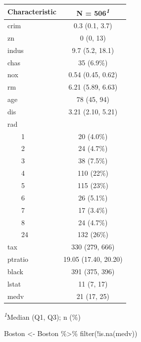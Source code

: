 \documentclass[
]{article}
\newenvironment{Shaded}{\begin{snugshade}}{\end{snugshade}}
\newcommand{\FunctionTok}[1]{\textcolor[rgb]{0.28,0.35,0.67}{#1}}
\newcommand{\NormalTok}[1]{\textcolor[rgb]{0.00,0.23,0.31}{#1}}
\newcommand{\OtherTok}[1]{\textcolor[rgb]{0.00,0.23,0.31}{#1}}
\newcommand{\SpecialCharTok}[1]{\textcolor[rgb]{0.37,0.37,0.37}{#1}}
\begin{document}
\begin{table}
\fontsize{12.0pt}{14.4pt}\selectfont
\begin{tabular*}{\linewidth}{@{\extracolsep{\fill}}lc}
\toprule
\textbf{Characteristic} & \textbf{N = 506}\textsuperscript{\textit{1}} \\ 
\midrule\addlinespace[2.5pt]
crim & 0.3 (0.1, 3.7) \\ 
zn & 0 (0, 13) \\ 
indus & 9.7 (5.2, 18.1) \\ 
chas & 35 (6.9\%) \\ 
nox & 0.54 (0.45, 0.62) \\ 
rm & 6.21 (5.89, 6.63) \\ 
age & 78 (45, 94) \\ 
dis & 3.21 (2.10, 5.21) \\ 
rad &  \\ 
    1 & 20 (4.0\%) \\ 
    2 & 24 (4.7\%) \\ 
    3 & 38 (7.5\%) \\ 
    4 & 110 (22\%) \\ 
    5 & 115 (23\%) \\ 
    6 & 26 (5.1\%) \\ 
    7 & 17 (3.4\%) \\ 
    8 & 24 (4.7\%) \\ 
    24 & 132 (26\%) \\ 
tax & 330 (279, 666) \\ 
ptratio & 19.05 (17.40, 20.20) \\ 
black & 391 (375, 396) \\ 
lstat & 11 (7, 17) \\ 
medv & 21 (17, 25) \\ 
\bottomrule
\end{tabular*}
\begin{minipage}{\linewidth}
\textsuperscript{\textit{1}}Median (Q1, Q3); n (\%)\\
\end{minipage}
\end{table}

\begin{Shaded}
\begin{Highlighting}[]
\NormalTok{Boston }\OtherTok{\textless{}{-}}\NormalTok{ Boston }\SpecialCharTok{\%\textgreater{}\%} \FunctionTok{filter}\NormalTok{(}\SpecialCharTok{!}\FunctionTok{is.na}\NormalTok{(medv))}
\end{Highlighting}
\end{Shaded}
\end{document}

